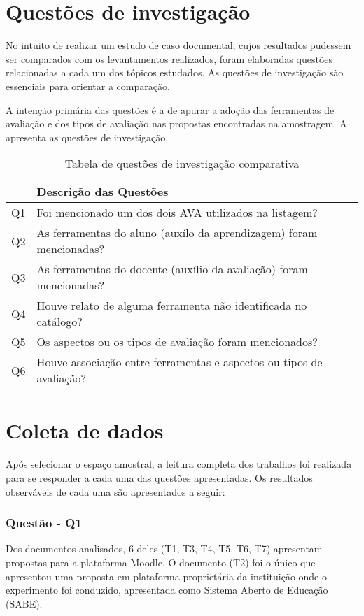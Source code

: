 \section{Questões de investigação}%

No intuito de realizar um estudo de caso documental, cujos resultados pudessem ser comparados com os levantamentos realizados, foram elaboradas questões relacionadas a cada um dos tópicos estudados. As questões de investigação são essenciais para orientar a comparação. 

A intenção primária das questões é a de apurar a adoção das ferramentas de avaliação e dos tipos de avaliação nas propostas encontradas na amostragem. A  apresenta as questões de investigação.

\begin{table}[ht!]
\setlength{\bigstrutjot}{3pt}
\caption{Tabela de questões de investigação comparativa}
\label{tab:question}
\centering
    \begin{tabular}{|l|l|}
    \hline 
        \bigstrut
         & {Descrição das Questões}  \\
    	\hline
        \bigstrut[t]
        Q1	& Foi mencionado um dos dois AVA utilizados na listagem?\\ 	
        Q2  & As ferramentas do aluno (auxílo da aprendizagem) foram mencionadas?\\      
        Q3  & As ferramentas do docente (auxílio da avaliação) foram mencionadas?\\
        Q4  & Houve relato de alguma ferramenta não identificada no catálogo?\\          
        Q5  & Os aspectos ou os tipos de avaliação foram mencionados?\\         
        \bigstrut[b]
        Q6  & Houve associação entre ferramentas e aspectos ou tipos de avaliação?\\
    \hline
    \end{tabular}
\end{table}

\section{Coleta de dados}%

Após selecionar o espaço amostral, a leitura completa dos trabalhos foi realizada para se responder a cada uma das questões apresentadas. Os resultados observáveis de cada uma são apresentados a seguir:

\subsubsection{Questão - Q1}
Dos documentos analisados, 6 deles (T1, T3, T4, T5, T6, T7) apresentam propostas para a plataforma Moodle. O documento (T2) foi o único que apresentou uma proposta em plataforma proprietária da instituição onde o experimento foi conduzido, apresentada como Sistema Aberto de Educação (SABE).

